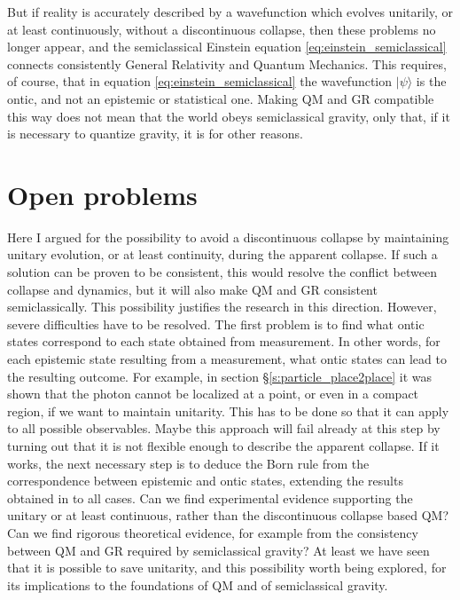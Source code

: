 \documentclass[12pt]{amsart}
\theoremstyle{definition}
\theoremstyle{plain}
\begin{document}
But if reality is accurately described by a wavefunction which evolves unitarily, or at least continuously, without a discontinuous collapse, then these problems no longer appear, and the semiclassical Einstein equation \eqref{eq:einstein_semiclassical} connects consistently General Relativity and Quantum Mechanics. 
This requires, of course, that in equation \eqref{eq:einstein_semiclassical} the wavefunction $|{\psi}\rangle$ is the ontic, and not an epistemic or statistical one.
Making QM and GR compatible this way does not mean that the world obeys semiclassical gravity, only that, if it is necessary to quantize gravity, it is for other reasons.


\section{Open problems}
\label{s:open}

Here I argued for the possibility to avoid a discontinuous collapse by maintaining unitary evolution, or at least continuity, during the apparent collapse. If such a solution can be proven to be consistent, this would resolve the conflict between collapse and dynamics, but it will also make QM and GR consistent semiclassically. This possibility justifies the research in this direction. However, severe difficulties have to be resolved. The first problem is to find what ontic states correspond to each state obtained from measurement. In other words, for each epistemic state resulting from a measurement, what ontic states can lead to the resulting outcome. For example, in section \S\ref{s:particle_place2place} it was shown that the photon cannot be localized at a point, or even in a compact region, if we want to maintain unitarity. This has to be done so that it can apply to all possible observables.  Maybe this approach will fail already at this step by turning out that it is not flexible enough to describe the apparent collapse. If it works, the next necessary step is to deduce the Born rule from the correspondence between epistemic and ontic states, extending the results obtained in \cite{shaarawi1994diffraction} to all cases. 
Can we find experimental evidence supporting the unitary or at least continuous, rather than the discontinuous collapse based QM?
Can we find rigorous theoretical evidence, for example from the consistency between QM and GR required by semiclassical gravity?
At least we have seen that it is possible to save unitarity, and this possibility worth being explored, for its implications to the foundations of QM and of semiclassical gravity.
\end{document}
